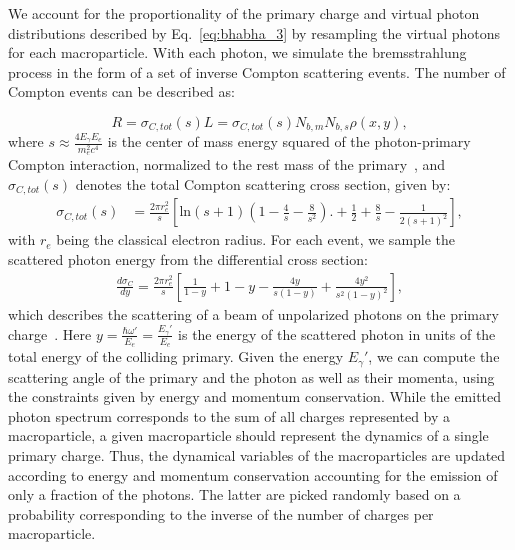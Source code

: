 We account for the proportionality of the primary charge and virtual photon distributions described by Eq.~\eqref{eq:bhabha_3} by resampling the virtual photons for each macroparticle. With each photon, we simulate the bremsstrahlung process in the form of a set of inverse Compton scattering events. The number of Compton events can be described as:

\begin{equation}
	R = \sigma_{C,tot}(s)L = \sigma_{C,tot}(s) N_{b,m} N_{b,s} \rho(x,y),
	\label{eq:bhabha_5}
\end{equation}
where $\displaystyle s\approx\frac{4E_\gamma E_e}{m_e^2c^4}$ is the center of mass energy squared of the photon-primary Compton interaction, normalized to the rest mass of the primary~\cite{GINZBURG198347}, and $\sigma_{C,tot}(s)$ denotes the total Compton scattering cross section, given by:
\begin{equation}
	\begin{split}
		\sigma_{C,tot}(s) & = \frac{2\pi r_e^2}{s}\left[\mathrm{ln}(s+1)\left(1 - \frac{4}{s} - \frac{8}{s^2}\right).+ \frac{1}{2} + \frac{8}{s} - \frac{1}{2(s+1)^2}\right],
	\end{split}
	\label{eq:bhabha_6}
\end{equation}
with $\displaystyle r_e$ being the classical electron radius. For each event, we sample the scattered photon energy from the differential cross section:
\begin{equation}
	\begin{split}
		\frac{d\sigma_C}{dy} = \frac{2\pi r_e^2}{s}\left[ \frac{1}{1-y} + 1 - y - \frac{4y}{s(1-y)} + \frac{4y^2}{s^2(1-y)^2} \right],
	\end{split}
	\label{eq:bhabha_7}
\end{equation}
which describes the scattering of a beam of unpolarized photons on the primary charge~\cite{Schulte:331845}. Here $\displaystyle y=\frac{\hbar\omega'}{E_e}=\frac{E_\gamma'}{E_e}$ is the energy of the scattered photon in units of the total energy of the colliding primary. Given the energy $E_\gamma'$, we can compute the scattering angle of the primary and the photon as well as their momenta, using the constraints given by energy and momentum conservation. While the emitted photon spectrum corresponds to the sum of all charges represented by a macroparticle, a given macroparticle should represent the dynamics of a single primary charge. Thus, the dynamical variables of the macroparticles are updated according to energy and momentum conservation accounting for the emission of only a fraction of the photons. The latter are picked randomly based on a probability corresponding to the inverse of the number of charges per macroparticle. 


